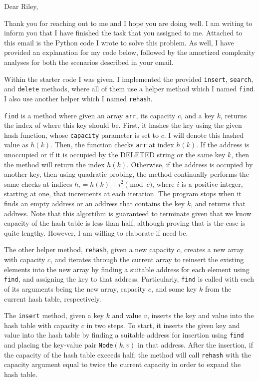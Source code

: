 \documentclass[11pt]{article}
\begin{document}
    Dear Riley,

    \medskip

    Thank you for reaching out to me and I hope you are doing well. I am writing to inform you that I have finished the task that you assigned to me. Attached to this email is the Python code I wrote to solve this problem. As well, I have provided an explanation for my code below, followed by the amortized complexity analyses for both the scenarios described in your email.

    Within the starter code I was given, I implemented the provided \texttt{insert}, \texttt{search}, and \texttt{delete} methods, where all of them use a helper method which I named \texttt{find}. I also use another helper which I named \texttt{rehash}.

    \texttt{find} is a method where given an array \texttt{arr}, its capacity \(c\), and a key \(k\), returns the index of where this key should be. First, it hashes the key using the given hash function, whose \texttt{capacity} parameter is set to \(c\). I will denote this hashed value as \(h(k)\). Then, the function checks \texttt{arr} at index \(h(k)\). If the address is unoccupied or if it is occupied by the DELETED string or the same key \(k\), then the method will return the index \(h(k)\). Otherwise, if the address is occupied by another key, then using quadratic probing, the method continually performs the same checks at indices \(h_i = h(k) + i^2 \pmod c\), where \(i\) is a positive integer, starting at one, that increments at each iteration. The program stops when it finds an empty address or an address that contains the key \(k\), and returns that address. Note that this algortihm is guaranteed to terminate given that we know capacity of the hash table is less than half, although proving that is the case is quite lengthy. However, I am willing to elaborate if need be.

    The other helper method, \texttt{rehash}, given a new capacity \(c\), creates a new array with capacity \(c\), and iterates through the current array to reinsert the existing elements into the new array by finding a suitable address for each element using \texttt{find}, and assigning the key to that address. Particularly, \texttt{find} is called with each of its arguments being the new array, capacity \(c\), and some key \(k\) from the current hash table, respectively.

    The \texttt{insert} method, given a key \(k\) and value \(v\), inserts the key and value into the hash table with capacity \(c\) in two steps. To start, it inserts the given key and value into the hash table by finding a suitable address for insertion using \texttt{find} and placing the key-value pair \texttt{Node}\((k,v)\) in that address. After the insertion, if the capacity of the hash table exceeds half, the method will call \texttt{rehash} with the capacity argument equal to twice the current capacity in order to expand the hash table.
\end{document}

